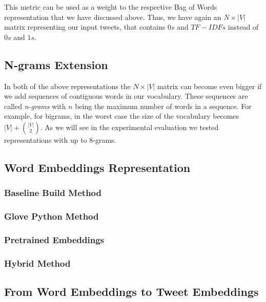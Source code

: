  This metric can be used as a weight to the respective Bag of Words representation that we have discussed above.
 Thus, we have again an $N \times |V|$ matrix representing our input tweets,
 that contains $0s$ and $TF-IDFs$ instead of $0s$ and $1s$.
 
 
   \subsection{N-grams Extension}
 
 In both of the above representations the $N \times |V|$ matrix
 can become even bigger if we add sequences of contiguous words in our vocabulary.
 These sequences are called \textit{n-grams} with $n$ being the maximum number of words in a sequence.  
 For example, for bigrams, in the worst case the size of the vocabulary becomes $|V| + {|V| \choose 2}$.
 As we will see in the experimental evaluation we tested representations with up to 8-grams. 
 
 
 
\subsection{Word Embeddings Representation}

\subsubsection{Baseline Build Method}

\subsubsection{Glove Python Method}

\subsubsection{Pretrained Embeddings}

\subsubsection{Hybrid Method}

\subsection{From Word Embeddings to Tweet Embeddings}